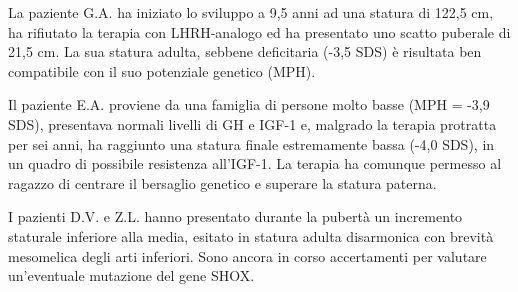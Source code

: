 La paziente G.A. ha iniziato lo sviluppo a 9,5 anni ad una statura di 122,5 cm, ha rifiutato la terapia con LHRH-analogo ed ha presentato uno scatto puberale di 21,5 cm. La sua statura adulta, sebbene deficitaria (-3,5 SDS) è risultata ben compatibile con il suo potenziale genetico (MPH). 

Il paziente E.A. proviene da una famiglia di persone molto basse (MPH = -3,9 SDS), presentava normali livelli di GH e IGF-1 e, malgrado la terapia protratta per sei anni, ha raggiunto una statura finale estremamente bassa (-4,0 SDS), in un quadro di possibile resistenza all'IGF-1. La terapia ha comunque permesso al ragazzo di centrare il bersaglio genetico e superare la statura paterna.

I pazienti D.V. e Z.L. hanno presentato durante la pubertà un incremento staturale inferiore alla media, esitato in statura adulta disarmonica con brevità mesomelica degli arti inferiori. Sono ancora in corso accertamenti per valutare un'eventuale mutazione del gene SHOX. 

  


